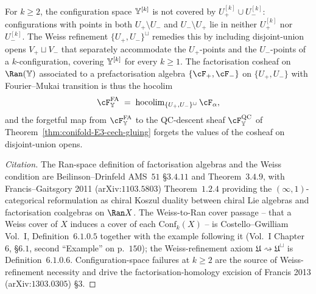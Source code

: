 \begin{proposition}
\label{prop:conifold-ran-criterion}
For $k \geq 2$, the configuration space $\mathbb{Y}^{[k]}$ is not covered by $U_+^{[k]} \cup U_-^{[k]}$: configurations with points in both $U_+ \setminus U_-$ and $U_- \setminus U_+$ lie in neither $U_+^{[k]}$ nor $U_-^{[k]}$. The Weiss refinement $\{U_+, U_-\}^\sqcup$ remedies this by including disjoint-union opens $V_+ \sqcup V_-$ that separately accommodate the $U_+$-points and the $U_-$-points of a $k$-configuration, covering $\mathbb{Y}^{[k]}$ for every $k \geq 1$. The factorisation cosheaf on $\Ran(\bY)$ associated to a prefactorisation algebra $\{\cF_+, \cF_-\}$ on $\{U_+, U_-\}$ with Fourier--Mukai transition is thus the hocolim
\[
 \cF^{\mathrm{FA}}_{\bY} \;=\; \mathrm{hocolim}_{\{U_+, U_-\}^\sqcup}\, \cF_\alpha,
\]
and the forgetful map from $\cF^{\mathrm{FA}}_{\bY}$ to the QC-descent sheaf $\cF^{\mathrm{QC}}_{\bY}$ of Theorem~\ref{thm:conifold-E3-cech-gluing} forgets the values of the cosheaf on disjoint-union opens.
\end{proposition}

\begin{proof}[Citation]
The Ran-space definition of factorisation algebras and the Weiss condition are Beilinson--Drinfeld AMS~$51$ §$3.4.11$ and Theorem~$3.4.9$, with Francis--Gaitsgory 2011 (arXiv:$1103.5803$) Theorem~$1.2.4$ providing the $(\infty,1)$-categorical reformulation as chiral Koszul duality between chiral Lie algebras and factorisation coalgebras on $\Ran X$. The Weiss-to-Ran cover passage -- that a Weiss cover of $X$ induces a cover of each $\mathrm{Conf}_k(X)$ -- is Costello--Gwilliam Vol.~I, Definition~$6.1.0.5$ together with the example following it (Vol.~I Chapter~$6$, §$6.1$, second ``Example'' on p.~$150$); the Weiss-refinement axiom $\mathfrak U \rightsquigarrow \mathfrak U^\sqcup$ is Definition~$6.1.0.6$. Configuration-space failures at $k \geq 2$ are the source of Weiss-refinement necessity and drive the factorisation-homology excision of Francis 2013 (arXiv:$1303.0305$) §$3$.
\end{proof}


